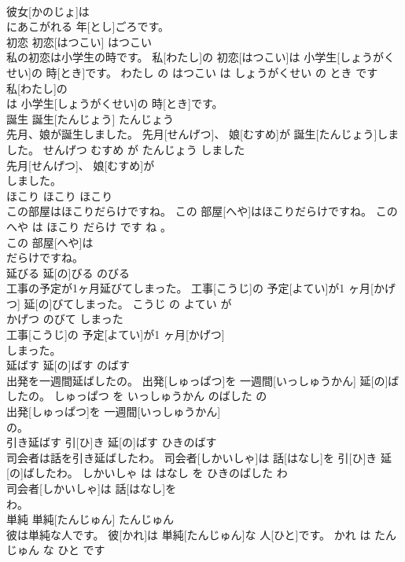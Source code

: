 \documentclass[8pt]{extreport}
\begin{document}
\begin{CJK}{UTF8}{min}
\\	彼女[かのじょ]は
\\	にあこがれる 年[とし]ごろです。			
\\	初恋	初恋[はつこい]	はつこい	
\\	私の初恋は小学生の時です。	私[わたし]の 初恋[はつこい]は 小学生[しょうがくせい]の 時[とき]です。	わたし の はつこい は しょうがくせい の とき です	
\\	私[わたし]の
\\	は 小学生[しょうがくせい]の 時[とき]です。			
\\	誕生	誕生[たんじょう]	たんじょう	
\\	先月、娘が誕生しました。	先月[せんげつ]、 娘[むすめ]が 誕生[たんじょう]しました。	せんげつ むすめ が たんじょう しました	
\\	先月[せんげつ]、 娘[むすめ]が
\\	しました。			
\\	ほこり	ほこり	ほこり	
\\	この部屋はほこりだらけですね。	この 部屋[へや]はほこりだらけですね。	この へや は ほこり だらけ です ね 。	
\\	この 部屋[へや]は
\\	だらけですね。			
\\	延びる	延[の]びる	のびる	
\\	工事の予定が1ヶ月延びてしまった。	工事[こうじ]の 予定[よてい]が1 ヶ月[かげつ] 延[の]びてしまった。	こうじ の よてい が 
\\	かげつ のびて しまった	
\\	工事[こうじ]の 予定[よてい]が1 ヶ月[かげつ]
\\	しまった。			
\\	延ばす	延[の]ばす	のばす	
\\	出発を一週間延ばしたの。	出発[しゅっぱつ]を 一週間[いっしゅうかん] 延[の]ばしたの。	しゅっぱつ を いっしゅうかん のばした の	
\\	出発[しゅっぱつ]を 一週間[いっしゅうかん]
\\	の。			
\\	引き延ばす	引[ひ]き 延[の]ばす	ひきのばす	
\\	司会者は話を引き延ばしたわ。	司会者[しかいしゃ]は 話[はなし]を 引[ひ]き 延[の]ばしたわ。	しかいしゃ は はなし を ひきのばした わ	
\\	司会者[しかいしゃ]は 話[はなし]を
\\	わ。			
\\	単純	単純[たんじゅん]	たんじゅん	
\\	彼は単純な人です。	彼[かれ]は 単純[たんじゅん]な 人[ひと]です。	かれ は たんじゅん な ひと です	

\end{CJK}
\end{document}
